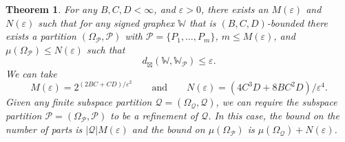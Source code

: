 \documentclass{amsart}
\numberwithin{equation}{section}
\numberwithin{figure}{section}
\newtheorem{theorem}{Theorem}[section]
\theoremstyle{definition}
\theoremstyle{remark}
\newcommand{\eps}{\varepsilon}
\newcommand{\cP}{\mathcal{P}}
\newcommand{\cQ}{\mathcal{Q}}
\newcommand{\cW}{\mathbb{W}}
\newcommand{\sP}{\mathscr{P}}
\newcommand{\sQ}{\mathscr{Q}}
\begin{document}
\begin{theorem} \label{regularity-lemma}
For any $B,C,D<\infty$, and $\varepsilon>0$, there exists an $M(\varepsilon)$
and $N(\varepsilon)$ such that for any signed graphex $\cW$ that is
$(B,C,D)$-bounded there exists a partition $(\Omega_{\sP},\cP)$ with
$\cP=\{P_1,\dots,P_m\}$, $m \le M(\varepsilon)$, and $\mu(\Omega_{\sP}) \le
N(\varepsilon)$ such that
\[
d_\boxtimes(\cW,\cW_{\sP})\leq \eps.
\]
We can take
\[
 M(\eps)=2^{(2BC+CD)/\eps^2}\qquad\text{and}\qquad
 N(\varepsilon)=
(4C^3D+8BC^2D)/{\eps^4}.
 \]
Given any finite subspace partition $\sQ=(\Omega_{\sQ},\cQ)$, we can require
the subspace partition $\sP=(\Omega_{\sP},\cP)$ to be a refinement of $\sQ$.
In this case, the bound on the number of parts is $|\cQ|M(\varepsilon)$ and
the bound on $\mu(\Omega_{\sP})$ is $\mu(\Omega_{\cQ})+N(\varepsilon)$.
\end{theorem}
\end{document}
